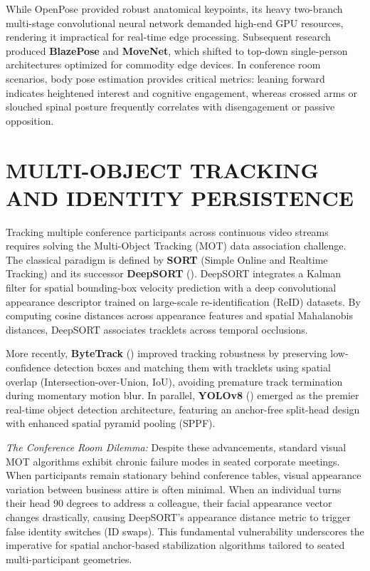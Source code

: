 \documentclass[12pt,a4paper,oneside]{report}
\providecommand{\parencite}[1]{(\cite{#1})}
\begin{document}
While OpenPose provided robust anatomical keypoints, its heavy two-branch multi-stage convolutional neural network demanded high-end GPU resources, rendering it impractical for real-time edge processing. Subsequent research produced \textbf{BlazePose} and \textbf{MoveNet}, which shifted to top-down single-person architectures optimized for commodity edge devices. In conference room scenarios, body pose estimation provides critical metrics: leaning forward indicates heightened interest and cognitive engagement, whereas crossed arms or slouched spinal posture frequently correlates with disengagement or passive opposition.

\section{MULTI-OBJECT TRACKING AND IDENTITY PERSISTENCE}
Tracking multiple conference participants across continuous video streams requires solving the Multi-Object Tracking (MOT) data association challenge. The classical paradigm is defined by \textbf{SORT} (Simple Online and Realtime Tracking) and its successor \textbf{DeepSORT} \parencite{wojke2017simple}. DeepSORT integrates a Kalman filter for spatial bounding-box velocity prediction with a deep convolutional appearance descriptor trained on large-scale re-identification (ReID) datasets. By computing cosine distances across appearance features and spatial Mahalanobis distances, DeepSORT associates tracklets across temporal occlusions.

More recently, \textbf{ByteTrack} \parencite{zhang2022bytetrack} improved tracking robustness by preserving low-confidence detection boxes and matching them with tracklets using spatial overlap (Intersection-over-Union, IoU), avoiding premature track termination during momentary motion blur. In parallel, \textbf{YOLOv8} \parencite{jocher2023yolo} emerged as the premier real-time object detection architecture, featuring an anchor-free split-head design with enhanced spatial pyramid pooling (SPPF).

\textit{The Conference Room Dilemma:} Despite these advancements, standard visual MOT algorithms exhibit chronic failure modes in seated corporate meetings. When participants remain stationary behind conference tables, visual appearance variation between business attire is often minimal. When an individual turns their head 90 degrees to address a colleague, their facial appearance vector changes drastically, causing DeepSORT's appearance distance metric to trigger false identity switches (ID swaps). This fundamental vulnerability underscores the imperative for spatial anchor-based stabilization algorithms tailored to seated multi-participant geometries.
\end{document}
